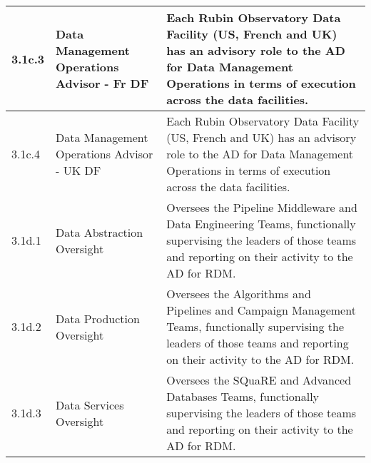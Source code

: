 \begin{longtable} {|p{}|p{}|p{}|}
{3.1c.3}&{Data Management Operations Advisor - Fr DF}&{Each Rubin Observatory Data Facility (US, French and UK) has an advisory role to the AD for Data Management Operations in terms of execution across the data facilities.  } \\ \hline
{3.1c.4}&{Data Management Operations Advisor - UK DF}&{Each Rubin Observatory Data Facility (US, French and UK) has an advisory role to the AD for Data Management Operations in terms of execution across the data facilities.  } \\ \hline
{3.1d.1}&{Data Abstraction Oversight}&{Oversees the Pipeline Middleware and Data Engineering Teams, functionally supervising the leaders of those teams and reporting on their activity to the AD for RDM. } \\ \hline
{3.1d.2}&{Data Production Oversight}&{Oversees the Algorithms and Pipelines and Campaign Management Teams, functionally supervising the leaders of those teams and reporting on their activity to the AD for RDM. } \\ \hline
{3.1d.3}&{Data Services Oversight}&{Oversees the SQuaRE and Advanced Databases Teams, functionally supervising the leaders of those teams and reporting on their activity to the AD for RDM. } \\ \hline
\end{longtable} \normalsize

